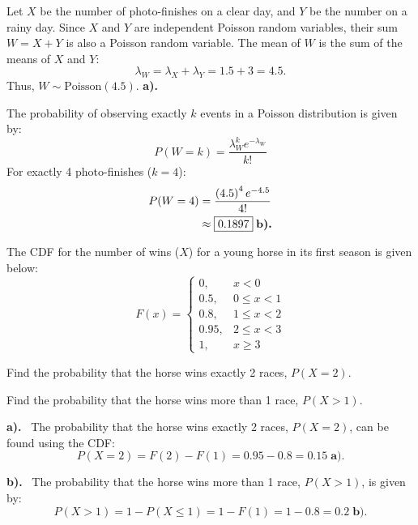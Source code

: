 \documentclass[a4paper, 10pt]{article}
\begin{document}
\begin{solution}
	Let \( X \) be the number of photo-finishes on a clear day, and \( Y \) be the number on a rainy day.
	Since \( X \) and \( Y \) are independent Poisson random variables, their sum \( W = X + Y \) is also a Poisson random variable.
	The mean of \( W \) is the sum of the means of \( X \) and \( Y \):
	\[
		\lambda_W = \lambda_X + \lambda_Y = 1.5 + 3 = 4.5.
	\]
	Thus, \( \boxed{W \sim \text{Poisson}(4.5)} \). \textbf{a).}

	\myspace

	\par\noindent The probability of observing exactly \( k \) events in a Poisson distribution is given by:
	\[
		P(W = k) = \frac{\lambda_W^k e^{-\lambda_W}}{k!}
	\]
	For exactly 4 photo-finishes (\( k = 4 \)):
	\begin{align*}
		P(W = 4) & = \frac{\left(4.5\right)^4 e^{-4.5}}{4!}    \\
		         & \approx \boxed{0.1897} \; \textbf{b).}
	\end{align*}
\end{solution}

\begin{problem}
The CDF for the number of wins (\( X \)) for a young horse in its first season is given below:
\[
	F(x) =
	\begin{cases}
		0,    & x < 0        \\
		0.5,  & 0 \leq x < 1 \\
		0.8,  & 1 \leq x < 2 \\
		0.95, & 2 \leq x < 3 \\
		1,    & x \geq 3
	\end{cases}
\]
\begin{subproblems_alpha}
	\item Find the probability that the horse wins exactly 2 races, \( P(X = 2) \).
	\item Find the probability that the horse wins more than 1 race, \( P(X > 1) \).
\end{subproblems_alpha}
\end{problem}

\begin{solution}
	\par\noindent\textbf{a).} \, The probability that the horse wins exactly 2 races, \( P(X = 2) \), can be found using the CDF:
	\[
		P(X = 2) = F(2) - F(1) = 0.95 - 0.8 = \boxed{0.15} \; \textbf{a).}
	\]

	\myspace

	\par\noindent\textbf{b).} \, The probability that the horse wins more than 1 race, \( P(X > 1) \), is given by:
	\[
		P(X > 1) = 1 - P(X \leq 1) = 1 - F(1) = 1 - 0.8 = \boxed{0.2} \; \textbf{b).}
	\]
\end{solution}
\end{document}
